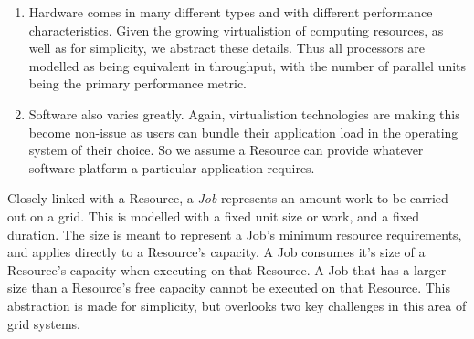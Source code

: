 \begin{enumerate}

  \item Hardware comes in many different types and with different performance
    characteristics. Given the growing virtualistion of computing resources,
    as well as for simplicity, we abstract these details. Thus all processors are
    modelled as being equivalent in throughput, with the number of parallel
    units being the primary performance metric.

  \item Software also varies greatly. Again, virtualistion technologies are
    making this become non-issue as users can bundle their application load in the
    operating system of their choice. So we assume a Resource can provide
    whatever software platform a particular application requires.

\end{enumerate}

Closely linked with a Resource, a \textit{Job} represents an amount work to be
carried out on a grid. This is modelled with a fixed unit size or work, and a
fixed duration. The size is meant to represent a Job's minimum resource
requirements, and applies directly to a Resource's capacity. A Job consumes
it's size of a Resource's capacity when executing on that Resource.  A Job that
has a larger size than a Resource's free capacity cannot be executed on that
Resource. This abstraction is made for simplicity, but overlooks two
key challenges in this area of grid systems. 

